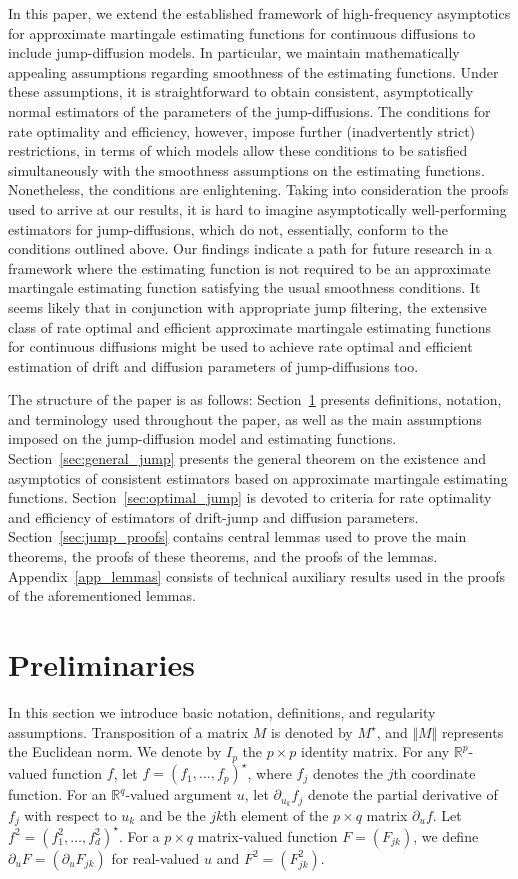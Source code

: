 \documentclass[11pt,a4paper]{article}
\newcommand{\RR}{{\mathbb R}}
\numberwithin{equation}{section}
\numberwithin{theorem}{section}
\begin{document}
In this paper, we extend the established framework of high-frequency asymptotics for approximate martingale estimating functions for continuous diffusions to include jump-diffusion models. In particular, we maintain mathematically appealing assumptions regarding smoothness of the estimating functions. Under these assumptions, it is straightforward to obtain consistent, asymptotically normal estimators of the parameters of the jump-diffusions. The conditions for rate optimality and efficiency, however, impose further (inadvertently strict) restrictions, in terms of which models allow these conditions to be satisfied simultaneously with the smoothness assumptions on the estimating functions. Nonetheless, the conditions are enlightening. Taking into consideration the proofs used to arrive at our results, it is hard to imagine asymptotically well-performing estimators for jump-diffusions, which do not, essentially, conform to the conditions outlined above. Our findings indicate a path for future research in a framework where the estimating function is not required to be an approximate martingale estimating function satisfying the usual smoothness conditions. It seems likely that in conjunction with appropriate jump filtering, the extensive class of rate optimal and efficient approximate martingale estimating functions for continuous diffusions might be used to achieve rate optimal and efficient estimation of drift and diffusion parameters of jump-diffusions too. \medskip

The structure of the paper is as follows: Section~\ref{sec:jump:prelim} presents definitions, notation, and terminology used throughout the paper, as well as the main assumptions imposed on the jump-diffusion model and estimating functions. Section~\ref{sec:general_jump} presents the general theorem on the existence and asymptotics of consistent estimators based on approximate martingale estimating functions. Section~\ref{sec:optimal_jump} is devoted to criteria for rate optimality and efficiency of estimators of drift-jump and diffusion parameters. Section~\ref{sec:jump_proofs} contains central lemmas used to prove the main theorems, the proofs of these theorems, and the proofs of the lemmas. Appendix~\ref{app_lemmas} consists of technical auxiliary results used in the proofs of the aforementioned lemmas.

\section{Preliminaries}\label{sec:jump:prelim}
In this section we introduce basic notation, definitions, and regularity assumptions. Transposition of a matrix $M$ is denoted by $M^\star$, and $\Vert M \Vert$ represents the Euclidean norm. We denote by $I_p$ the $p\times p$ identity matrix. For any $\RR^p$-valued function $f$, let $f=(f_1, \ldots, f_p)^\star $, where $f_j$ denotes the $j$th coordinate function. For an $\RR^q$-valued argument $u$, let $\partial_{u_k} f_j$ denote the partial derivative of $f_j$ with respect to $u_k$ and be the $jk$th element of the $p\times q$ matrix $\partial_u f$. Let $f^2 = (f_1^2, \ldots, f_d^2)^\star $. For a $p\times q$ matrix-valued function $F = (F_{jk})$, we define $\partial_u F = (\partial_u F_{jk})$ for real-valued $u$ and $F^2 = (F^2_{jk})$. \medskip
\end{document}
